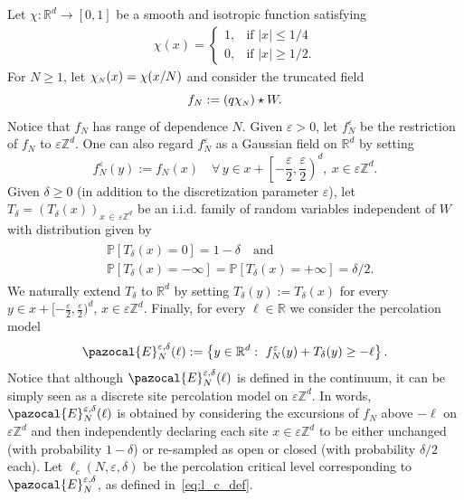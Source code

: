 \documentclass[10pt]{amsart}
\theoremstyle{definition}\newtheorem{defi}[theo]{Definition}\newtheorem{rema}[theo]{Remark}\newtheorem{exam}[theo]{Example}\newtheorem{exem}[theo]{Example}\newtheorem{nota}[theo]{Notation}
\renewcommand{\P}{\mathbb{P}}
\newcommand{\R}{\mathbb{R}}
\newcommand{\Z}{\mathbb{Z}}
\newcommand{\sN}{{\mathchoice{}{}{\scriptscriptstyle}{}N}}
\let\oldforall\forall
\renewcommand*{\forall}{\mathrel{\oldforall}}
\begin{document}
Let $\chi:\R^d\to [0,1]$ be a smooth and isotropic function satisfying
\begin{align*}
\chi(x)=
\begin{cases}
1, &\text{if } |x|\leq 1/4 \\
0, &\text{if } |x|\geq 1/2.
\end{cases}
\end{align*}
For $N\geq 1$, let $\chi_{\sN}(x)=\chi(x/N)$ and consider the truncated field
\begin{equation}
f_{N}:=\left(q\chi_{\sN}\right)\star W.
\end{equation}
Notice that $f_N$ has range of dependence $N$. Given $\varepsilon>0$, let $f_N^\varepsilon$ be the restriction of $f_N$ to $\varepsilon\Z^d$. One can also regard $f_N^{\varepsilon}$ as a Gaussian field on $\R^d$ by setting
\begin{equation}
f_N^\varepsilon(y):=f_N(x)\quad\forall\, y\in x+\left[-\frac{\varepsilon}{2},\frac{\varepsilon}{2}\right)^d,~x\in \varepsilon\Z^d.
\end{equation}
Given $\delta\geq0$ (in addition to the discretization parameter $\varepsilon$), let $T_\delta=(T_\delta(x))_{x\,\in\,\varepsilon\Z^d}$ be an i.i.d. family of random variables independent of $W$ with distribution given by
\begin{align}
\begin{split}
&\P\left[T_\delta(x)=0\right]=1-\delta\quad\text{and}\\
&\P\left[T_\delta(x)=-\infty\right]=\P\left[T_\delta(x)=+\infty\right]=\delta/2.
\end{split}
\end{align}
We naturally extend $T_\delta$ to $\R^d$ by setting $T_\delta(y):=T_\delta(x)$ for every $y\in x+[-\frac{\varepsilon}{2},\frac{\varepsilon}{2})^d$, $x\in\varepsilon\Z^d$. Finally, for every $\ell\in \R$ we consider the percolation model
\begin{equation}
\pazocal{E}_N^{\varepsilon,\delta}(\ell):= \left\{y\in \R^d :~f_N^\varepsilon(y)+T_\delta(y)\geq -\ell\right\}.
\end{equation}
Notice that although $\pazocal{E}_N^{\varepsilon,\delta}(\ell)$ is defined in the continuum, it can be simply seen as a discrete site percolation model on $\varepsilon\Z^d$. In words, $\pazocal{E}_N^{\varepsilon,\delta}(\ell)$ is obtained by considering the excursions of $f_N$ above $-\ell$ on $\varepsilon\Z^d$ and then independently declaring each site $x\in\varepsilon\Z^d$ to be either unchanged (with probability $1-\delta$) or re-sampled as open or closed (with probability $\delta/2$ each). Let $\ell_c(N,\varepsilon,\delta)$ be the percolation critical level corresponding to $\pazocal{E}^{\varepsilon,\delta}_N$, as defined in~\eqref{eq:l_c_def}.
\end{document}
